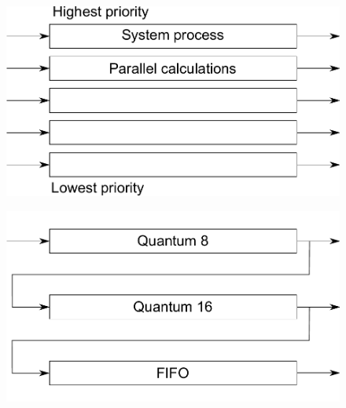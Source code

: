\begin{frame}{\sectitle}
\begin{figure}

\includegraphics[width=\textwidth]{images/multipleFiles.pdf}
\end{figure}

\end{frame}


\begin{frame}{\sectitle}
\begin{figure}
\includegraphics[width=\textwidth]{images/multipleFilesQt.pdf}
\end{figure}

\end{frame}


